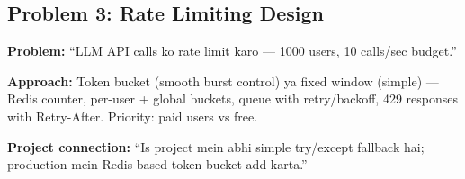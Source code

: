 \subsection{Problem 3: Rate Limiting Design}

\begin{interviewbox}
\textbf{Problem:} ``LLM API calls ko rate limit karo --- 1000 users, 10 calls/sec budget.''

\textbf{Approach:} Token bucket (smooth burst control) ya fixed window (simple) --- Redis counter, per-user + global buckets, queue with retry/backoff, 429 responses with Retry-After. Priority: paid users vs free.

\textbf{Project connection:} ``Is project mein abhi simple try/except fallback hai; production mein Redis-based token bucket add karta.''
\end{interviewbox}

